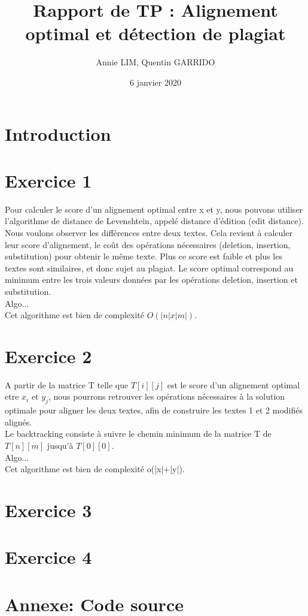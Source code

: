 \documentclass{article}
\title{Rapport de TP : Alignement optimal et détection de plagiat}
\author{Annie LIM, Quentin GARRIDO}
\date{6 janvier 2020}
\begin{document}
\maketitle
\tableofcontents
\pagebreak

\section{Introduction}


\section{Exercice 1}

Pour calculer le score d'un alignement optimal entre x et y, nous pouvons utiliser
l'algorithme de distance de Levenshtein, appelé distance d'édition (edit distance).
Nous voulons observer les différences entre deux textes. Cela revient à calculer 
leur score d'alignement, le coût des opérations nécessaires (deletion, insertion,
substitution) pour obtenir le même texte. Plus ce score est faible et plus les textes
sont similaires, et donc sujet au plagiat.
Le score optimal correspond au minimum entre les trois valeurs données par les opérations
deletion, insertion et substitution. \\
Algo...\\
Cet algorithme est bien de complexité $O(|n|x|m|)$.


\section{Exercice 2}

A partir de la matrice T telle que $T[i][j]$ est le score d'un alignement
optimal etre $x_{i}$ et $y_{j}$, nous pourrons retrouver les opérations
nécessaires à la solution optimale pour aligner les deux textes, afin de
construire les textes 1 et 2 modifiés alignés.\\
Le backtracking consiste à suivre le chemin minimum de la matrice T de
$T[n][m]$ jusqu'à $T[0][0]$.\\
Algo...\\
Cet algorithme est bien de complexité o(|x|+|y|).\\

\section{Exercice 3}


\section{Exercice 4}



\section{Annexe: Code source}
		
\end{document}

